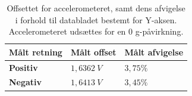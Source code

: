 \begin{table}[H]
	\centering
	\begin{tabular}{|l|l|l|} \hline
\textbf{Målt retning} & \textbf{Målt offset} & \textbf{Målt afvigelse} \\ \hline
    \textbf{Positiv} 			& $1,6362~V$	& $3,75 \%$    \\ \hline
    \textbf{Negativ} 			& $1,6413~V$	& $3,45 \%$	\\ \hline
	\end{tabular}
	\caption{Offsettet for accelerometeret, samt dens afvigelse i forhold til databladet bestemt for Y-aksen. Accelerometeret udsættes for en 0 g-påvirkning.}
	\label{tab:acc_offset}
\end{table}

